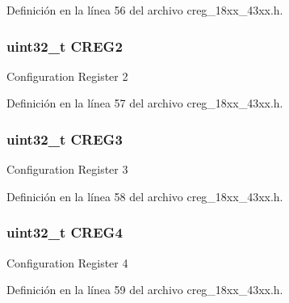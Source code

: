 Definición en la línea 56 del archivo creg\+\_\+18xx\+\_\+43xx.\+h.

\subsubsection[{\texorpdfstring{C\+R\+E\+G2}{CREG2}}]{ uint32\+\_\+t C\+R\+E\+G2}\hypertarget{struct_l_p_c___c_r_e_g___t_ad6c2620a8674135a34404595014e8753}{}\label{struct_l_p_c___c_r_e_g___t_ad6c2620a8674135a34404595014e8753}
Configuration Register 2 

Definición en la línea 57 del archivo creg\+\_\+18xx\+\_\+43xx.\+h.

\subsubsection[{\texorpdfstring{C\+R\+E\+G3}{CREG3}}]{ uint32\+\_\+t C\+R\+E\+G3}\hypertarget{struct_l_p_c___c_r_e_g___t_afee4ee92f4f379ca0554d226ba1f270d}{}\label{struct_l_p_c___c_r_e_g___t_afee4ee92f4f379ca0554d226ba1f270d}
Configuration Register 3 

Definición en la línea 58 del archivo creg\+\_\+18xx\+\_\+43xx.\+h.

\subsubsection[{\texorpdfstring{C\+R\+E\+G4}{CREG4}}]{ uint32\+\_\+t C\+R\+E\+G4}\hypertarget{struct_l_p_c___c_r_e_g___t_acc027fb2231c28519605e909fb4950c3}{}\label{struct_l_p_c___c_r_e_g___t_acc027fb2231c28519605e909fb4950c3}
Configuration Register 4 

Definición en la línea 59 del archivo creg\+\_\+18xx\+\_\+43xx.\+h.


